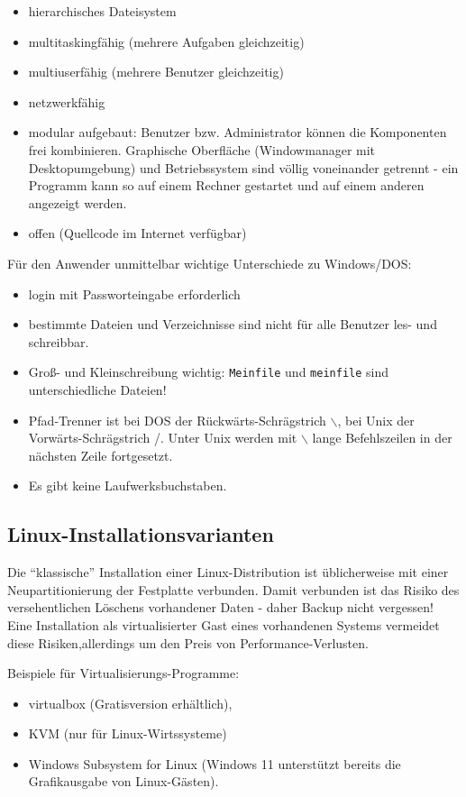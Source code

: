 \documentclass[11pt]{article}
\begin{document}
\begin{itemize}
\item hierarchisches Dateisystem
\item multitaskingfähig (mehrere Aufgaben gleichzeitig)
\item multiuserfähig (mehrere Benutzer gleichzeitig) 
\item netzwerkfähig
\item modular aufgebaut: Benutzer bzw. Administrator können die
Komponenten frei kombinieren. Graphische Oberfläche (Windowmanager mit Desktopumgebung)
und Betriebssystem sind völlig voneinander getrennt - ein Programm kann
so auf einem Rechner gestartet und auf einem anderen angezeigt werden.
\item offen (Quellcode im Internet verfügbar)
\end{itemize}

Für den Anwender unmittelbar wichtige Unterschiede zu Windows/DOS:
\begin{itemize}
\item login mit Passworteingabe erforderlich
\item bestimmte Dateien und Verzeichnisse sind  nicht für alle Benutzer
les- und schreibbar.
\item Groß- und Kleinschreibung wichtig: \texttt{Meinfile} und
\texttt{meinfile} sind unterschiedliche Dateien!
\item Pfad-Trenner ist bei DOS der Rückwärts-Schrägstrich $ \backslash
$, bei Unix der Vorwärts-Schrägstrich /. Unter Unix werden mit $
\backslash $ lange Befehlszeilen in der nächsten Zeile fortgesetzt.
\item Es gibt keine Laufwerksbuchstaben.
\end{itemize}

\subsection{Linux-Installationsvarianten}
Die ``klassische'' Installation einer Linux-Distribution ist üblicherweise
mit einer Neupartitionierung der Festplatte verbunden. Damit verbunden
ist das Risiko des versehentlichen Löschens vorhandener Daten - daher
Backup nicht vergessen! Eine Installation als virtualisierter Gast eines vorhandenen Systems vermeidet diese Risiken,allerdings  um den Preis von Performance-Verlusten.

Beispiele für Virtualisierungs-Programme: 
\begin{itemize}
\item virtualbox (Gratisversion erhältlich), 
\item KVM (nur für Linux-Wirtssysteme)
\item Windows Subsystem for Linux (Windows 11 unterstützt bereits die Grafikausgabe von Linux-Gästen).
\end{itemize}
\end{document}
